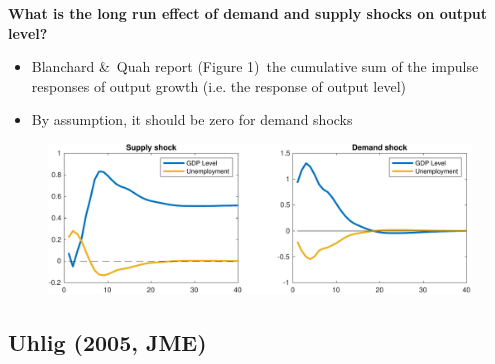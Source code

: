 \documentclass[10pt,english,t,aspectratio=169,ignorenonframetext]{beamer}
\begin{document}
\begin{frame}
{\textbf{What is the long run effect of demand and supply shocks on output
level?}}

\begin{itemize}
\item Blanchard \&\ Quah report (Figure 1)\ the cumulative sum of the
impulse responses of output growth (i.e. the response of output
level)\medskip

\item By assumption, it should be zero for demand shocks \  \vspace{%
-0.1cm}\pause
\end{itemize}

\begin{figure}[h]
\vspace{.3cm}\includegraphics[width=.8\textwidth]{BQ_Replication.pdf}
\end{figure}
\end{frame}


\subsection{Uhlig (2005, JME)}

\begin{frame}
\vspace{3cm} \color{title}%
\bigskip

\color{note}
\end{frame}

\end{document}
